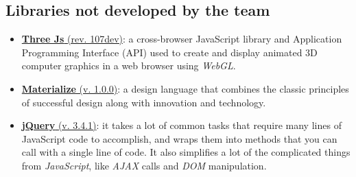 \documentclass{article}
\begin{document}
\subsection{Libraries not developed by the team}
\begin{itemize}
	\item \href{https://threejs.org/}{\textbf{Three Js} (rev. 107dev)}: a cross-browser JavaScript library and Application Programming Interface (API) used to create and display animated 3D computer graphics in a web browser using \textit{WebGL}.
	\item \href{https://materializecss.com/}{\textbf{Materialize} (v. 1.0.0)}: a design language that combines the classic principles of successful design along with innovation and technology.
	\item \href{https://jquery.com/}{\textbf{jQuery} (v. 3.4.1)}: it takes a lot of common tasks that require many lines of JavaScript code to accomplish, and wraps them into methods that you can call with a single line of code. It also simplifies a lot of the complicated things from \textit{JavaScript}, like \textit{AJAX} calls and \textit{DOM} manipulation.
\end{itemize}
\end{document}
